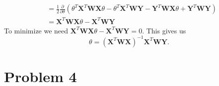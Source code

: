 \documentclass[11pt]{article}
\begin{document}
\begin{enumerate}
\begin{align*}
      &= \frac{1}{2}\frac{\partial}{\partial \theta}(\theta^T\textbf{X}^T\textbf{W}\textbf{X}\theta - \theta^T\textbf{X}^T\textbf{W}\textbf{Y} - \textbf{Y}^T\textbf{W}\textbf{X}\theta + \textbf{Y}^T\textbf{W}\textbf{Y})\\
      &= \textbf{X}^T\textbf{W}\textbf{X}\theta - \textbf{X}^T\textbf{W}\textbf{Y}
    \end{align*}
    To minimize we need $\textbf{X}^T\textbf{W}\textbf{X}\theta - \textbf{X}^T\textbf{W}\textbf{Y} = 0$. This gives us
    \begin{equation*}
      \theta = (\textbf{X}^T\textbf{W}\textbf{X})^{-1}\textbf{X}^T\textbf{W}\textbf{Y}.
    \end{equation*}
\end{enumerate}
\section{Problem 4}
\end{document}
